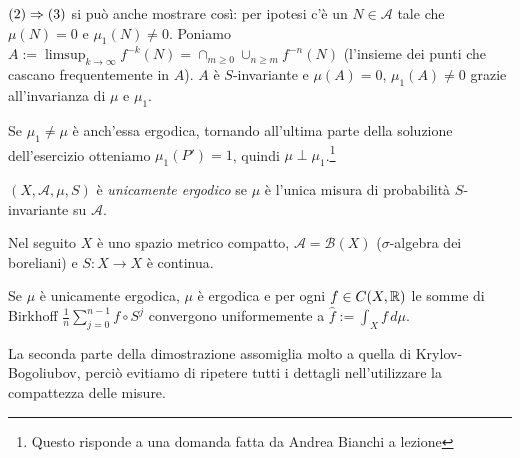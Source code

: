\begin{oss}$(2)\Rightarrow (3)$ si può anche mostrare così: per ipotesi c'è un $N\in\mathcal{A}$ tale che $\mu(N)=0$ e $\mu_1(N)\neq 0$.
Poniamo $A:=\limsup_{k\to\infty}f^{-k}(N)=\cap_{m\ge 0}\cup_{n\ge m}f^{-n}(N)$ (l'insieme dei punti che
cascano frequentemente in $A$). $A$ è $S$-invariante e $\mu(A)=0$, $\mu_1(A)\neq 0$ grazie all'invarianza di $\mu$ e $\mu_1$.
\end{oss}

\begin{oss}Se $\mu_1\neq\mu$ è anch'essa ergodica, tornando all'ultima parte della soluzione dell'esercizio
otteniamo $\mu_1(P')=1$, quindi $\mu\perp\mu_1$.\footnote{Questo risponde a una domanda fatta da Andrea Bianchi
a lezione}
\end{oss}

\begin{defi}$(X,\mathcal{A},\mu,S)$ è \emph{unicamente ergodico} se $\mu$ è l'unica misura di probabilità
$S$-invariante su $\mathcal{A}$.
\end{defi}

Nel seguito $X$ è uno spazio metrico compatto, $\mathcal{A}=\mathcal{B}(X)$ ($\sigma$-algebra dei boreliani)
e $S:X\to X$ è continua.

\begin{teo}Se $\mu$ è unicamente ergodica, $\mu$ è ergodica e per ogni $f\in C(X,\mathbb{R})$
le somme di Birkhoff $\frac{1}{n}\sum_{j=0}^{n-1}f\circ S^j$ convergono uniformemente a $\widehat{f}:=\int_X f\,d\mu$.
\end{teo}

La seconda parte della dimostrazione assomiglia molto a quella di Krylov-Bogoliubov,
perciò evitiamo di ripetere tutti i dettagli nell'utilizzare la compattezza delle misure.


